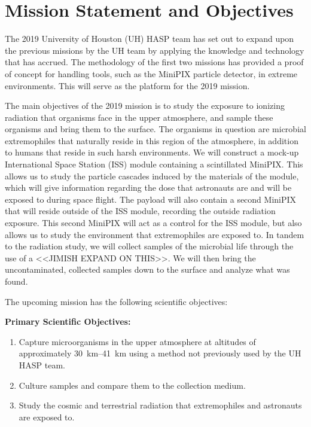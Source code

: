 \section{Mission Statement and Objectives}
\label{sec:Introduction}


The 2019 University of Houston (UH) HASP team has set out to expand upon the previous missions \cite{SORA1}\cite{SORA2} by the UH team by applying the knowledge and technology that has accrued.
The methodology of the first two missions has provided a proof of concept for handling tools, such as the MiniPIX particle detector,  in extreme environments.
This will serve as the platform for the 2019 mission.

The main objectives of the 2019 mission is to study the exposure to ionizing radiation that organisms face in the upper atmosphere, and sample these organisms and bring them to the surface.
The organisms in question are microbial extremophiles that naturally reside in this region of the atmosphere, in addition to humans that reside in such harsh environments.
We will construct a mock-up International Space Station (ISS) module containing a scintillated MiniPIX.
This allows us to study the particle cascades induced by the materials of the module, which will give information regarding the dose that astronauts are and will be exposed to during space flight.
The payload will also contain a second MiniPIX that will reside outside of the ISS module, recording the outside radiation exposure.
This second MiniPIX will act as a control for the ISS module, but also allows us to study the environment that extremophiles are exposed to.
In tandem to the radiation study, we will collect samples of the microbial life through the use of a <<JIMISH EXPAND ON THIS>>. We will then bring the uncontaminated, collected samples down to the surface and analyze what was found.

The upcoming mission has the following scientific objectives:

{\bf Primary Scientific Objectives:}
	\begin{enumerate}
	\item Capture microorganisms in the upper atmosphere at altitudes of approximately \SIrange{30}{41}{\kilo\meter} using a method not previously used by the UH HASP team. 
	\item Culture samples and compare them to the collection medium.
	\item Study the cosmic and terrestrial radiation that extremophiles and astronauts are exposed to.
	\end{enumerate}
	
